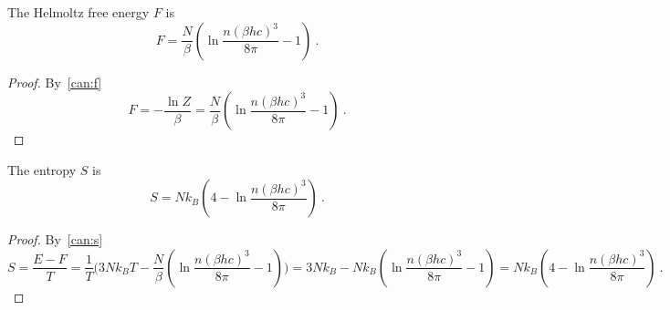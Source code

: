     The Helmoltz free energy $F$ is 
    \begin{equation*}
        F = \frac{N}{\beta} (\ln \frac{n (\beta h c)^3}{8\pi} - 1) ~.
    \end{equation*}
    \begin{proof}
        By~\eqref{can:f}
        \begin{equation*}
            F = - \frac{\ln Z}{\beta} = \frac{N}{\beta} (\ln \frac{n (\beta h c)^3}{8\pi} - 1) ~.
        \end{equation*}
    \end{proof}
    
    The entropy $S$ is 
    \begin{equation*}
        S = N k_B (4 - \ln \frac{n (\beta h c)^3}{8\pi} ) ~.
    \end{equation*}
    \begin{proof}
        By~\eqref{can:s}
        \begin{equation*}
            S = \frac{E - F}{T} = \frac{1}{T} \Big ( 3 N k_B T - \frac{N}{\beta} (\ln \frac{n (\beta h c)^3}{8\pi} - 1)  \Big ) = 3 N k_B - N k_B (\ln \frac{n (\beta h c)^3}{8\pi} - 1) = N k_B (4 - \ln \frac{n (\beta h c)^3}{8\pi} ) ~.
        \end{equation*}
    \end{proof}

